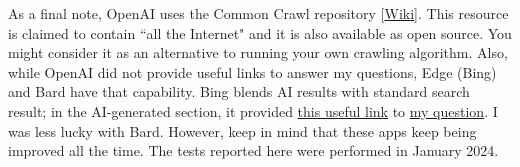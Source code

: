 \documentclass[oneside,10pt]{book}
\begin{document}
As a final note, \textcolor{index}{OpenAI} uses the \textcolor{index}{Common Crawl} repository [\href{https://en.wikipedia.org/wiki/Common_Crawl}{Wiki}]. This resource is claimed to contain ``all the Internet" and it is also available as open source. You might consider it as an alternative to running your own crawling algorithm. Also, while OpenAI did not provide useful links to answer my questions, Edge (Bing) and \textcolor{index}{Bard} have that capability. Bing blends AI results with standard search result; in the AI-generated section, it provided 
\href{https://math.stackexchange.com/questions/89030/expectation-of-the-maximum-of-gaussian-random-variables}{this useful link} to 
 \href{https://www.bing.com/search?q=what+is+the+asymptotic+expectation+of+the+range+for+gaussian+distributions}{my question}.
 I was less lucky with Bard. However, keep in mind that these apps keep being improved all the time. The tests reported here were performed in January 2024.

\vspace{1ex}
\end{document}
